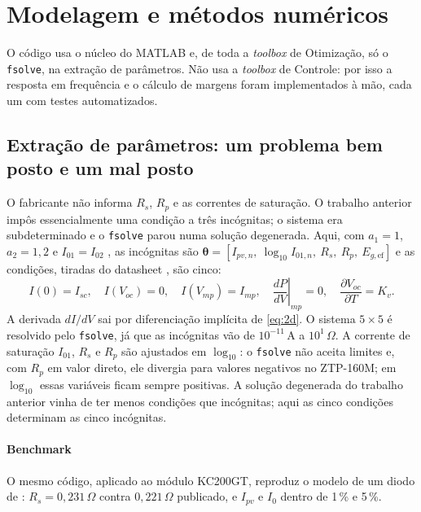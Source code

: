 \documentclass[3p,authoryear]{elsarticle}
\begin{document}
\section{Modelagem e métodos numéricos}
\label{sec:metodos}

O código usa o núcleo do MATLAB e, de toda a \emph{toolbox} de Otimização, só o \texttt{fsolve},
na extração de parâmetros. Não usa a \emph{toolbox} de Controle: por isso a resposta em frequência
e o cálculo de margens foram implementados à mão, cada um com testes automatizados.

\subsection{Extração de parâmetros: um problema bem posto e um mal posto}
\label{sec:extracao}

O fabricante não informa $R_s$, $R_p$ e as correntes de saturação. O trabalho anterior impôs
essencialmente uma condição a três incógnitas; o sistema era subdeterminado e o
\texttt{fsolve} parou numa solução degenerada. Aqui, com $a_1 = 1$, $a_2 = 1{,}2$ e
$I_{01} = I_{02}$ \citep{ishaque}, as incógnitas são
$\boldsymbol\theta = [I_{pv,n},\ \log_{10} I_{01,n},\ R_s,\ R_p,\ E_{g,\mathrm{ef}}]$ e as
condições, tiradas do datasheet \citep{ztp160m}, são cinco:
\begin{equation}
I(0) = I_{sc},\quad I(V_{oc}) = 0,\quad I(V_{mp}) = I_{mp},\quad
\left.\frac{dP}{dV}\right|_{mp} = 0,\quad \frac{\partial V_{oc}}{\partial T} = K_v.
\label{eq:condicoes}
\end{equation}
A derivada $dI/dV$ sai por diferenciação implícita de \eqref{eq:2d}. O sistema $5\times5$ é
resolvido pelo \texttt{fsolve}, já que as incógnitas vão de $10^{-11}$\,A a $10^{1}\,\Omega$. A corrente de saturação
$I_{01}$, $R_s$ e $R_p$ são ajustados em $\log_{10}$: o \texttt{fsolve} não aceita limites e,
com $R_p$ em valor direto, ele divergia para valores negativos no ZTP-160M; em $\log_{10}$ essas
variáveis ficam sempre positivas. A solução degenerada do trabalho anterior vinha de ter menos
condições que incógnitas; aqui as cinco condições determinam as cinco incógnitas.

\paragraph{Benchmark} O mesmo código, aplicado ao módulo KC200GT, reproduz o modelo de um
diodo de \citet{villalva}: $R_s = 0{,}231\,\Omega$ contra $0{,}221\,\Omega$ publicado, e
$I_{pv}$ e $I_0$ dentro de 1\,\% e 5\,\%.
\end{document}
